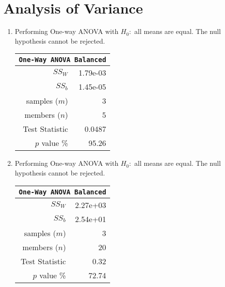 \chapter{Analysis of Variance}

\begin{enumerate}
	
	\item Performing One-way ANOVA with $ H_0 : $ all means are equal. The null hypothesis cannot be rejected.\\
	
	\begin{table}[H]
		\centering
		\begin{tabular}{@{}rr@{}}
			\toprule
			\multicolumn{2}{c}{\texttt{One-Way ANOVA Balanced}} \\
			\midrule
			$SS_W$         &               1.79e-03 \\
			$SS_b$         &               1.45e-05 \\
			samples ($m$)  &                      3 \\
			members ($n$)  &                      5 \\
			Test Statistic &                 0.0487 \\
			$p$ value \%   &                  95.26 \\
			\bottomrule
		\end{tabular}
		\bigskip
	\end{table}

	\item Performing One-way ANOVA with $ H_0 : $ all means are equal. The null hypothesis cannot be rejected.\\

	\begin{table}[H]
		\centering
		\begin{tabular}{@{}rr@{}}
			\toprule
			\multicolumn{2}{c}{\texttt{One-Way ANOVA Balanced}} \\
			\midrule
			$SS_W$         &               2.27e+03 \\
			$SS_b$         &               2.54e+01 \\
			samples ($m$)  &                      3 \\
			members ($n$)  &                     20 \\
			Test Statistic &                   0.32 \\
			$p$ value \%   &                  72.74 \\
			\bottomrule
		\end{tabular}
		\bigskip
	\end{table}


\end{enumerate}
